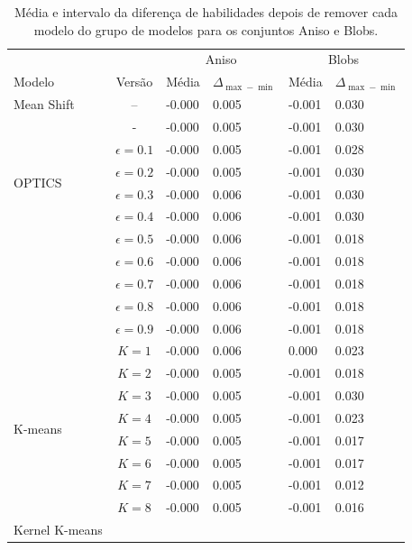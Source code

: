 \begin{table}[!t]
    \centering
    \tiny
    \caption{Média e intervalo da diferença de habilidades depois de remover cada modelo do grupo de modelos para os conjuntos Aniso e Blobs.}
    \label{tab:metrics_aniso_blobs}
    \begin{tabular}{l|c|ll|ll}
    \midrule
     & & \multicolumn{2}{c|}{Aniso} & \multicolumn{2}{c}{Blobs} \\
          Modelo & Versão & Média & $\Delta_{\max-\min}$ & Média & $\Delta_{\max-\min}$ \\
    \midrule
    Mean Shift      & -- & -0.000 & 0.005 & -0.001 & 0.030 \\
    \midrule
    \multirow[t]{6}{*}{OPTICS}
      & - & -0.000 & 0.005 & -0.001 & 0.030 \\
    \midrule
    \multirow[t]{9}{*}{DBSCAN} 
      & $\epsilon=0.1$ & -0.000 & 0.005 & -0.001 & 0.028 \\
      & $\epsilon=0.2$ & -0.000 & 0.005 & -0.001 & 0.030 \\
      & $\epsilon=0.3$ & -0.000 & 0.006 & -0.001 & 0.030 \\
      & $\epsilon=0.4$ & -0.000 & 0.006 & -0.001 & 0.030 \\
      & $\epsilon=0.5$ & -0.000 & 0.006 & -0.001 & 0.018 \\
      & $\epsilon=0.6$ & -0.000 & 0.006 & -0.001 & 0.018 \\
      & $\epsilon=0.7$ & -0.000 & 0.006 & -0.001 & 0.018 \\
      & $\epsilon=0.8$ & -0.000 & 0.006 & -0.001 & 0.018 \\
      & $\epsilon=0.9$ & -0.000 & 0.006 & -0.001 & 0.018 \\
    \midrule
    \multirow[t]{8}{*}{K-means} 
      & $K=1$ & -0.000 & 0.006 &  0.000 & 0.023 \\
      & $K=2$ & -0.000 & 0.005 & -0.001 & 0.018 \\
      & $K=3$ & -0.000 & 0.005 & -0.001 & 0.030 \\
      & $K=4$ & -0.000 & 0.005 & -0.001 & 0.023 \\
      & $K=5$ & -0.000 & 0.005 & -0.001 & 0.017 \\
      & $K=6$ & -0.000 & 0.005 & -0.001 & 0.017 \\
      & $K=7$ & -0.000 & 0.005 & -0.001 & 0.012 \\
      & $K=8$ & -0.000 & 0.005 & -0.001 & 0.016 \\
    \midrule
    \multirow[t]{8}{*}{Kernel K-means} 

\end{tabular}
\end{table}
